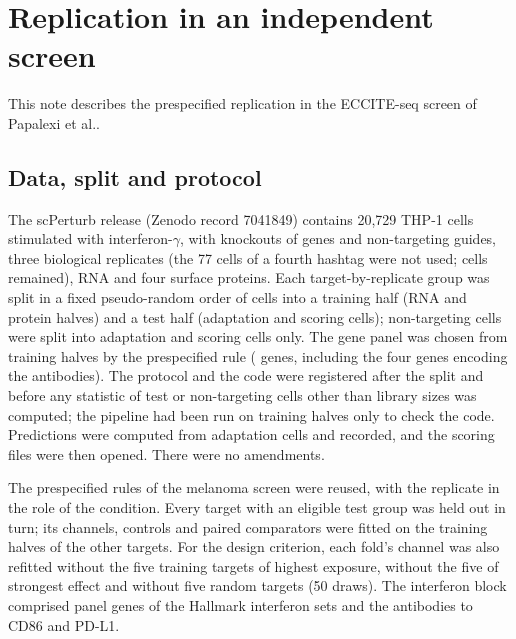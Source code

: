\section{Replication in an independent screen}\label{sec:rep}
This note describes the prespecified replication in the ECCITE-seq screen of Papalexi
et al.\cite{papalexi2021}.

\subsection*{Data, split and protocol}
The scPerturb release\cite{peidli2024} (Zenodo record 7041849) contains 20,729 THP-1 cells stimulated with interferon-$\gamma$,
with knockouts of \RpTargets{} genes and non-targeting guides, three biological
replicates (the 77 cells of a fourth hashtag were not used; \RpCells{} cells
remained), RNA and four surface proteins. Each target-by-replicate group was
split in a fixed pseudo-random order of cells into a training half (RNA and protein
halves) and a test half (adaptation and scoring cells); non-targeting cells were
split into adaptation and scoring cells only. The gene panel was chosen from
training halves by the prespecified rule (\RpGenes{} genes, including the four genes
encoding the antibodies). The protocol and the code were registered after the split and before any statistic of test or
non-targeting cells other than library sizes was computed; the pipeline had been
run on training halves only to check the code. Predictions were computed from
adaptation cells and recorded, and the scoring files were
then opened. There were no amendments.

The prespecified rules of the melanoma screen were reused, with the replicate in the
role of the condition. Every target with an eligible test group was held out in
turn; its channels, controls and paired comparators were fitted on the training
halves of the other targets. For the design criterion, each fold's channel was
also refitted without the five training targets of highest exposure, without the
five of strongest effect and without five random targets (50 draws). The
interferon block comprised \RpIfnGenes{} panel genes of the Hallmark
interferon sets and the antibodies to CD86 and PD-L1.


